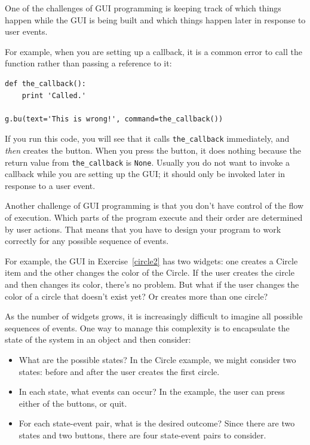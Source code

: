 \documentclass[10pt]{book}
\begin{document}
\begin{CJK}{UTF8}{gbsn}
One of the challenges of GUI programming is keeping track of
which things happen while the GUI is being built and which
things happen later in response to user events.

For example, when you are setting up a callback, it is a common error
to call the function rather than passing a reference to it:

\begin{verbatim}
def the_callback():
    print 'Called.'

g.bu(text='This is wrong!', command=the_callback())
\end{verbatim}
%
If you run this code, you will see that it calls \verb"the_callback"
immediately, and {\em then} creates the button.  When you press the
button, it does nothing because the return value from 
\verb"the_callback" is {\tt None}.
Usually you do not want to invoke a callback while you are
setting up the GUI; it should only be invoked later in response to
a user event.

Another challenge of GUI programming is that you don't have control
of the flow of execution.  Which parts of the program execute
and their order are determined by user actions.
That means that you have to design your program to work correctly
for any possible sequence of events.

For example, the GUI in Exercise~\ref{circle2} has two widgets:
one creates a Circle item and the other changes the color of the
Circle.  If the user creates the circle and then changes its color,
there's no problem.  But what if the user changes the color of
a circle that doesn't exist yet?  Or creates more than one circle?

As the number of widgets grows, it is increasingly difficult to
imagine all possible sequences of events.  One way to manage this 
complexity is to encapsulate the state of the system in an object
and then consider:

\begin{itemize}

\item What are the possible states?  In the Circle example, we
might consider two states: before and after the user creates the
first circle.

\item In each state, what events can occur?  In the example,
the user can press either of the buttons, or quit.

\item For each state-event pair, what is the desired outcome?
Since there are two states and two buttons, there are four
state-event pairs to consider.


\end{itemize}
\end{CJK}
\end{document}
